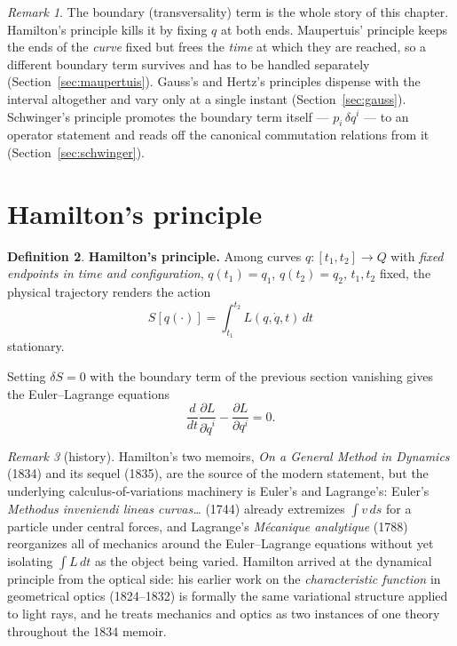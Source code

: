 \documentclass[11pt]{book}
\theoremstyle{definition}
\newtheorem{definition}{Definition}[section]
\theoremstyle{plain}
\theoremstyle{remark}
\newtheorem{remark}[definition]{Remark}
\begin{document}
\begin{remark}
\label{rem:boundary}
The boundary (transversality) term is the whole story of this chapter. Hamilton's principle kills it by fixing $q$ at both ends. Maupertuis' principle keeps the ends of the \emph{curve} fixed but frees the \emph{time} at which they are reached, so a different boundary term survives and has to be handled separately (Section~\ref{sec:maupertuis}). Gauss's and Hertz's principles dispense with the interval altogether and vary only at a single instant (Section~\ref{sec:gauss}). Schwinger's principle promotes the boundary term itself --- $p_i\,\delta q^i$ --- to an operator statement and reads off the canonical commutation relations from it (Section~\ref{sec:schwinger}).
\end{remark}

\section{Hamilton's principle}
\label{sec:hamilton}

\begin{definition}
\textbf{Hamilton's principle.} Among curves $q:[t_1,t_2]\to Q$ with \emph{fixed endpoints in time and configuration}, $q(t_1)=q_1$, $q(t_2)=q_2$, $t_1,t_2$ fixed, the physical trajectory renders the action
\[
S[q(\cdot)] = \int_{t_1}^{t_2} L(q,\dot q,t)\,dt
\]
stationary.
\end{definition}

Setting $\delta S=0$ with the boundary term of the previous section vanishing gives the Euler--Lagrange equations
\[
\frac{d}{dt}\frac{\partial L}{\partial \dot q^i} - \frac{\partial L}{\partial q^i} = 0 .
\]

\begin{remark}[history]
Hamilton's two memoirs, \emph{On a General Method in Dynamics} (1834) and its sequel (1835), are the source of the modern statement, but the underlying calculus-of-variations machinery is Euler's and Lagrange's: Euler's \emph{Methodus inveniendi lineas curvas\ldots} (1744) already extremizes $\int v\,ds$ for a particle under central forces, and Lagrange's \emph{Mécanique analytique} (1788) reorganizes all of mechanics around the Euler--Lagrange equations without yet isolating $\int L\,dt$ as the object being varied. Hamilton arrived at the dynamical principle from the optical side: his earlier work on the \emph{characteristic function} in geometrical optics (1824--1832) is formally the same variational structure applied to light rays, and he treats mechanics and optics as two instances of one theory throughout the 1834 memoir.
\end{remark}
\end{document}
